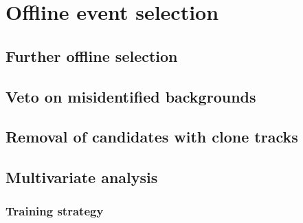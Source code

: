 \clearpage
\newpage
\section{Offline event selection}\label{sec:selection}

\subsection{Further offline selection}

\subsection{Veto on misidentified backgrounds}


\subsection{Removal of candidates with clone tracks}

\subsection{Multivariate analysis}
\subsubsection{Training strategy}

